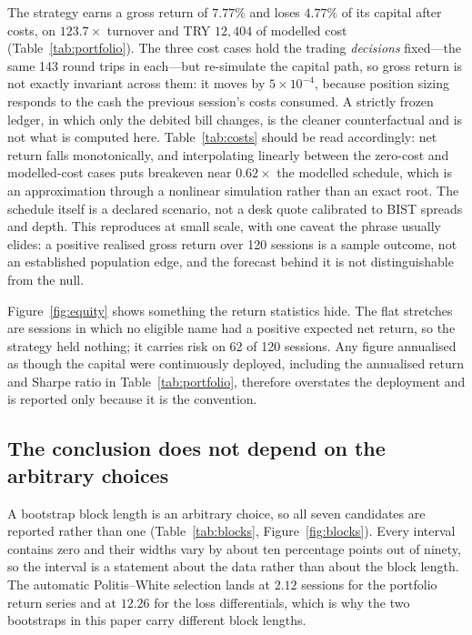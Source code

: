 \documentclass{article}
\theoremstyle{plain}
\theoremstyle{remark}
\begin{document}
The strategy earns a gross return of $7.77\%$ and loses $4.77\%$ of its capital
after costs, on $123.7\times$ turnover and TRY $12{,}404$ of modelled cost
(Table~\ref{tab:portfolio}). The three cost cases hold the trading
\emph{decisions} fixed---the same 143 round trips in each---but re-simulate the
capital path, so gross return is not exactly invariant across them: it moves by
$5\times 10^{-4}$, because position sizing responds to the cash the previous
session's costs consumed. A strictly frozen ledger, in which only the debited
bill changes, is the cleaner counterfactual and is not what is computed here.
Table~\ref{tab:costs} should be read accordingly: net return falls
monotonically, and interpolating linearly between the zero-cost and
modelled-cost cases puts breakeven near $0.62\times$ the modelled schedule,
which is an approximation through a nonlinear simulation rather than an exact
root. The schedule itself is a declared scenario, not a desk quote calibrated to
BIST spreads and depth. This reproduces \citet{novymarx2016} at small
scale, with one caveat the phrase usually elides: a positive realised gross
return over 120 sessions is a sample outcome, not an established population
edge, and the forecast behind it is not distinguishable from the null.

Figure~\ref{fig:equity} shows something the return statistics hide. The flat
stretches are sessions in which no eligible name had a positive expected net
return, so the strategy held nothing; it carries risk on 62 of 120 sessions. Any
figure annualised as though the capital were continuously deployed, including the
annualised return and Sharpe ratio in Table~\ref{tab:portfolio}, therefore
overstates the deployment and is reported only because it is the convention.

\subsection{The conclusion does not depend on the arbitrary choices}

A bootstrap block length is an arbitrary choice, so all seven candidates are
reported rather than one (Table~\ref{tab:blocks}, Figure~\ref{fig:blocks}). Every
interval contains zero and their widths vary by about ten percentage points out
of ninety, so the interval is a statement about the data rather than about the
block length. The automatic Politis--White selection lands at $2.12$ sessions for
the portfolio return series and at $12.26$ for the loss differentials, which is
why the two bootstraps in this paper carry different block lengths.
\end{document}

